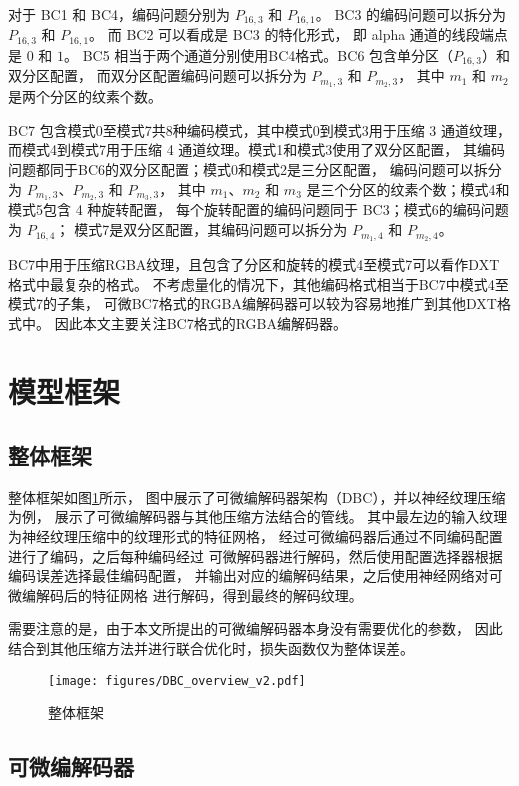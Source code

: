对于 BC1 和 BC4，编码问题分别为 $P_{16,3}$ 和 $P_{16,1}$。
BC3 的编码问题可以拆分为 $P_{16,3}$ 和 $P_{16,1}$。
而 BC2 可以看成是 BC3 的特化形式，
即 alpha 通道的线段端点是 $0$ 和 $1$。
BC5 相当于两个通道分别使用BC4格式。BC6 包含单分区（$P_{16,3}$）和双分区配置，
而双分区配置编码问题可以拆分为 $P_{m_1,3}$ 和 $P_{m_2,3}$，
其中 $m_1$ 和 $m_2$ 是两个分区的纹素个数。

BC7 包含模式0至模式7共8种编码模式，其中模式0到模式3用于压缩 3 通道纹理，
而模式4到模式7用于压缩 4 通道纹理。模式1和模式3使用了双分区配置，
其编码问题都同于BC6的双分区配置；模式0和模式2是三分区配置，
编码问题可以拆分为 $P_{m_1,3}$、$P_{m_2,3}$ 和 $P_{m_3,3}$，
其中 $m_1$、$m_2$ 和 $m_3$ 是三个分区的纹素个数；模式4和模式5包含 4 种旋转配置，
每个旋转配置的编码问题同于 BC3；模式6的编码问题为 $P_{16,4}$；
模式7是双分区配置，其编码问题可以拆分为  $P_{m_1,4}$ 和 $P_{m_2,4}$。

BC7中用于压缩RGBA纹理，且包含了分区和旋转的模式4至模式7可以看作DXT格式中最复杂的格式。
不考虑量化的情况下，其他编码格式相当于BC7中模式4至模式7的子集，
可微BC7格式的RGBA编解码器可以较为容易地推广到其他DXT格式中。
因此本文主要关注BC7格式的RGBA编解码器。

\section{模型框架}

\subsection{整体框架}

整体框架如图\ref{fig:DBC_overview}所示，
图中展示了可微编解码器架构（DBC），并以神经纹理压缩为例，
展示了可微编解码器与其他压缩方法结合的管线。
其中最左边的输入纹理为神经纹理压缩中的纹理形式的特征网格，
经过可微编码器后通过不同编码配置进行了编码，之后每种编码经过
可微解码器进行解码，然后使用配置选择器根据编码误差选择最佳编码配置，
并输出对应的编解码结果，之后使用神经网络对可微编解码后的特征网格
进行解码，得到最终的解码纹理。

需要注意的是，由于本文所提出的可微编解码器本身没有需要优化的参数，
因此结合到其他压缩方法并进行联合优化时，损失函数仅为整体误差。

\begin{figure}[htbp]
    \centering
    \texttt{[image: figures/DBC\_overview\_v2.pdf]}
    \caption{整体框架}
    \label{fig:DBC_overview}
\end{figure}


\subsection{可微编解码器}

